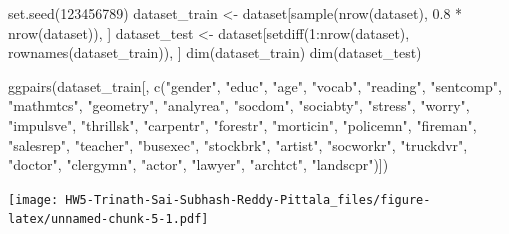 \documentclass[
]{article}
\newenvironment{Shaded}{\begin{snugshade}}{\end{snugshade}}
\newcommand{\DecValTok}[1]{\textcolor[rgb]{0.00,0.00,0.81}{#1}}
\newcommand{\FloatTok}[1]{\textcolor[rgb]{0.00,0.00,0.81}{#1}}
\newcommand{\FunctionTok}[1]{\textcolor[rgb]{0.00,0.00,0.00}{#1}}
\newcommand{\NormalTok}[1]{#1}
\newcommand{\OtherTok}[1]{\textcolor[rgb]{0.56,0.35,0.01}{#1}}
\newcommand{\SpecialCharTok}[1]{\textcolor[rgb]{0.00,0.00,0.00}{#1}}
\newcommand{\StringTok}[1]{\textcolor[rgb]{0.31,0.60,0.02}{#1}}
\begin{document}
\begin{Shaded}
\begin{Highlighting}[]
\FunctionTok{set.seed}\NormalTok{(}\DecValTok{123456789}\NormalTok{)}
\NormalTok{dataset\_train }\OtherTok{\textless{}{-}}\NormalTok{ dataset[}\FunctionTok{sample}\NormalTok{(}\FunctionTok{nrow}\NormalTok{(dataset), }\FloatTok{0.8} \SpecialCharTok{*} \FunctionTok{nrow}\NormalTok{(dataset)),}
\NormalTok{    ]}
\NormalTok{dataset\_test }\OtherTok{\textless{}{-}}\NormalTok{ dataset[}\FunctionTok{setdiff}\NormalTok{(}\DecValTok{1}\SpecialCharTok{:}\FunctionTok{nrow}\NormalTok{(dataset), }\FunctionTok{rownames}\NormalTok{(dataset\_train)),}
\NormalTok{    ]}
\FunctionTok{dim}\NormalTok{(dataset\_train)}
\FunctionTok{dim}\NormalTok{(dataset\_test)}
\end{Highlighting}
\end{Shaded}

\begin{Shaded}
\begin{Highlighting}[]
\FunctionTok{ggpairs}\NormalTok{(dataset\_train[, }\FunctionTok{c}\NormalTok{(}\StringTok{"gender"}\NormalTok{, }\StringTok{"educ"}\NormalTok{, }\StringTok{"age"}\NormalTok{, }\StringTok{"vocab"}\NormalTok{, }\StringTok{"reading"}\NormalTok{,}
    \StringTok{"sentcomp"}\NormalTok{, }\StringTok{"mathmtcs"}\NormalTok{, }\StringTok{"geometry"}\NormalTok{, }\StringTok{"analyrea"}\NormalTok{, }\StringTok{"socdom"}\NormalTok{,}
    \StringTok{"sociabty"}\NormalTok{, }\StringTok{"stress"}\NormalTok{, }\StringTok{"worry"}\NormalTok{, }\StringTok{"impulsve"}\NormalTok{, }\StringTok{"thrillsk"}\NormalTok{, }\StringTok{"carpentr"}\NormalTok{,}
    \StringTok{"forestr"}\NormalTok{, }\StringTok{"morticin"}\NormalTok{, }\StringTok{"policemn"}\NormalTok{, }\StringTok{"fireman"}\NormalTok{, }\StringTok{"salesrep"}\NormalTok{,}
    \StringTok{"teacher"}\NormalTok{, }\StringTok{"busexec"}\NormalTok{, }\StringTok{"stockbrk"}\NormalTok{, }\StringTok{"artist"}\NormalTok{, }\StringTok{"socworkr"}\NormalTok{, }\StringTok{"truckdvr"}\NormalTok{,}
    \StringTok{"doctor"}\NormalTok{, }\StringTok{"clergymn"}\NormalTok{, }\StringTok{"actor"}\NormalTok{, }\StringTok{"lawyer"}\NormalTok{, }\StringTok{"archtct"}\NormalTok{, }\StringTok{"landscpr"}\NormalTok{)])}
\end{Highlighting}
\end{Shaded}

\texttt{[image: HW5-Trinath-Sai-Subhash-Reddy-Pittala\_files/figure-latex/unnamed-chunk-5-1.pdf]}
\end{document}

